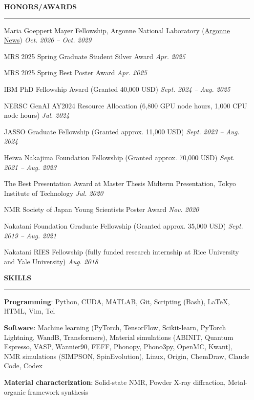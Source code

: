 \documentclass[10pt,a4paper]{article}
\newcommand{\cvsection}[1]{%
  \needspace{3\baselineskip}%
  \vspace{4pt}%
  {\normalsize\bfseries\MakeUppercase{#1}}\par
  \vspace{-6pt}\noindent\rule{\linewidth}{0.6pt}\par
  \vspace{-4pt}}
\begin{document}
\cvsection{Honors/Awards}
\begin{cvitems}
  \item Maria Goeppert Mayer Fellowship, Argonne National Laboratory (\href{https://www.anl.gov/article/argonne-honors-four-earlycareer-researchers-with-named-fellowships}{Argonne News}) \textbar{} \textit{Oct. 2026 -- Oct. 2029}
  \item MRS 2025 Spring Graduate Student Silver Award \textbar{} \textit{Apr. 2025}
  \item MRS 2025 Spring Best Poster Award \textbar{} \textit{Apr. 2025}
  \item IBM PhD Fellowship Award (Granted 40,000 USD) \textbar{} \textit{Sept. 2024 -- Aug. 2025}
  \item NERSC GenAI AY2024 Resource Allocation (6,800 GPU node hours, 1,000 CPU node hours) \textbar{} \textit{Jul. 2024}
  \item JASSO Graduate Fellowship (Granted approx. 11,000 USD) \textbar{} \textit{Sept. 2023 -- Aug. 2024}
  \item Heiwa Nakajima Foundation Fellowship (Granted approx. 70,000 USD) \textbar{} \textit{Sept. 2021 -- Aug. 2023}
  \item The Best Presentation Award at Master Thesis Midterm Presentation, Tokyo Institute of Technology \textbar{} \textit{Jul. 2020}
  \item NMR Society of Japan Young Scientists Poster Award \textbar{} \textit{Nov. 2020}
  \item Nakatani Foundation Graduate Fellowship (Granted approx. 35,000 USD) \textbar{} \textit{Sept. 2019 -- Aug. 2021}
  \item Nakatani RIES Fellowship (fully funded research internship at Rice University and Yale University) \textbar{} \textit{Aug. 2018}
\end{cvitems}

\cvsection{Skills}
\begin{cvitems}
  \item \textbf{Programming}: Python, CUDA, MATLAB, Git, Scripting (Bash), LaTeX, HTML, Vim, Tcl
  \item \textbf{Software}: Machine learning (PyTorch, TensorFlow, Scikit-learn, PyTorch Lightning, WandB, Transformers), Material simulations (ABINIT, Quantum Espresso, VASP, Wannier90, FEFF, Phonopy, Phono3py, OpenMC, Kwant), NMR simulations (SIMPSON, SpinEvolution), Linux, Origin, ChemDraw, Claude Code, Codex
  \item \textbf{Material characterization}: Solid-state NMR, Powder X-ray diffraction, Metal-organic framework synthesis
\end{cvitems}
\end{document}
